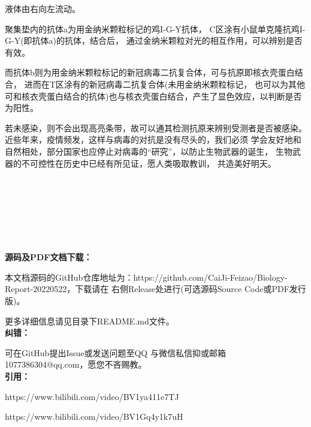 \documentclass[UTF8,a4paper,11 pt]{ctexart}%
\begin{document}
	液体由右向左流动。
	
	聚集垫内的抗体a为用金纳米颗粒标记的鸡I-G-Y抗体，
	C区涂有小鼠单克隆抗鸡I-G-Y(即抗体a)的抗体，结合后，
	通过金纳米颗粒对光的相互作用，可以辨别是否有效。

	而抗体b则为用金纳米颗粒标记的新冠病毒二抗复合体，可与抗原即核衣壳蛋白结合，
	进而在T区涂有的新冠病毒二抗复合体(未用金纳米颗粒标记，
	也可以为其他可和核衣壳蛋白结合的抗体)也与核衣壳蛋白结合，产生了显色效应，以判断是否为阳性。

	若未感染，则不会出现高亮条带，故可以通其检测抗原来辨别受测者是否被感染。
	\clearpage
	近些年来，疫情频发，这样与病毒的对抗是没有尽头的，我们必须
	学会友好地和自然相处，部分国家也应停止对病毒的“研究”，以防止生物武器的诞生，
	生物武器的不可控性在历史中已经有所见证，愿人类吸取教训，
	共造美好明天。
	\\\,\\\,\\\,\\\,\\\,\\\,\\\,
	\\\textbf{源码及PDF文档下载：}

	本文档源码的GitHub仓库地址为：https://github.com/CaiJi-Feizao/Biology-Report-20220522，下载请在
	右侧Release处进行(可选源码Source Code或PDF发行版)。

	更多详细信息请见目录下README.md文件。
	\\\textbf{纠错：}
	
	可在GitHub提出Issue或发送问题至QQ
	与微信私信抑或邮箱1077386304@qq.com，愿您不吝赐教。
	\\\textbf{引用：}

	https://www.bilibili.com/video/BV1ya411e7TJ

	https://www.bilibili.com/video/BV1Gq4y1k7uH
\end{document}
